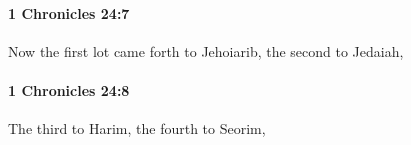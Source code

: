 		\paragraph{1 Chronicles 24:7} %
			\label{1CHRONICLES-24-7}

			Now the first lot came forth to Jehoiarib, the second to Jedaiah,


		\paragraph{1 Chronicles 24:8} %
			\label{1CHRONICLES-24-8}

			The third to Harim, the fourth to Seorim,


